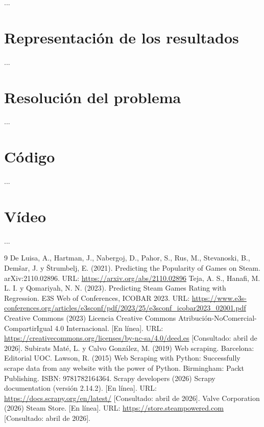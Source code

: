 \documentclass[
]{article}
\begin{document}
...

\section{Representación de los
resultados}\label{representaciuxf3n-de-los-resultados}

...

\section{Resolución del problema}\label{resoluciuxf3n-del-problema}

...

\section{Código}\label{cuxf3digo}

...

\section{Vídeo}\label{vuxeddeo}

...

\begin{thebibliography}{9}\label{ref:Ref}
   De Luisa, A., Hartman, J., Nabergoj, D., Pahor, S., Rus, M., Stevanoski, B., Demšar, J. y Štrumbelj, E. (2021). Predicting the Popularity of Games on Steam. arXiv:2110.02896. URL: \url{https://arxiv.org/abs/2110.02896}
   Teja, A. S., Hanafi, M. L. I. y Qomariyah, N. N. (2023). Predicting Steam Games Rating with Regression. E3S Web of Conferences, ICOBAR 2023. URL: \url{https://www.e3s-conferences.org/articles/e3sconf/pdf/2023/25/e3sconf_icobar2023_02001.pdf}
   Creative Commons (2023) Licencia Creative Commons Atribución-NoComercial-CompartirIgual 4.0 Internacional. [En línea]. URL: \url{https://creativecommons.org/licenses/by-nc-sa/4.0/deed.es} [Consultado: abril de 2026].
   Subirats Maté, L. y Calvo González, M. (2019) Web scraping. Barcelona: Editorial UOC.
   Lawson, R. (2015) Web Scraping with Python: Successfully scrape data from any website with the power of Python. Birmingham: Packt Publishing. ISBN: 9781782164364.
   Scrapy developers (2026) Scrapy documentation (versión 2.14.2). [En línea]. URL: \url{https://docs.scrapy.org/en/latest/} [Consultado: abril de 2026].
   Valve Corporation (2026) Steam Store. [En línea]. URL: \url{https://store.steampowered.com} [Consultado: abril de 2026].
\end{thebibliography}
\end{document}
